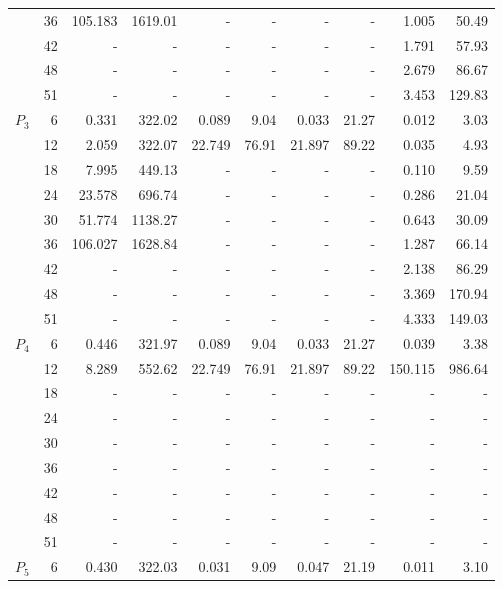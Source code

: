 \begin{figure}[h!]
\begin{tabular}{| r | r | r | r | r | r | r | r | r | r |}
		{} & 36 & 105.183 & 1619.01 & - & - & - & - & 1.005 & 50.49  \\
		{} & 42 & - & - & - & - & - & - & 1.791 & 57.93  \\
		{} & 48 & - & - & - & - & - & - & 2.679 & 86.67  \\
		{} & 51 & - & - & - & - & - & - & 3.453 & 129.83  \\
		\hline
		\multirow{6}{*}{$P_3$} & 6 & 0.331 & 322.02 & 0.089 & 9.04 & 0.033 & 21.27 & 0.012 & 3.03  \\
		{} & 12 & 2.059 & 322.07 & 22.749 & 76.91 & 21.897 & 89.22 & 0.035 & 4.93  \\
		{} & 18 & 7.995 & 449.13 & - & - & - & - & 0.110 & 9.59  \\
		{} & 24 & 23.578 & 696.74 & - & - & - & - & 0.286 & 21.04  \\
		{} & 30 & 51.774 & 1138.27 & - & - & - & - & 0.643 & 30.09  \\
		{} & 36 & 106.027 & 1628.84 & - & - & - & - & 1.287 & 66.14  \\
		{} & 42 & - & - & - & - & - & - & 2.138 & 86.29  \\
		{} & 48 & - & - & - & - & - & - & 3.369 & 170.94  \\
		{} & 51 & - & - & - & - & - & - & 4.333 & 149.03  \\
		\hline
		\multirow{6}{*}{$P_4$} & 6 & 0.446 & 321.97 & 0.089 & 9.04 & 0.033 & 21.27 & 0.039 & 3.38  \\
		{} & 12 & 8.289 & 552.62 & 22.749 & 76.91 & 21.897 & 89.22 & 150.115 & 986.64  \\
		{} & 18 & - & - & - & - & - & - & - & -  \\
		{} & 24 & - & - & - & - & - & - & - & -  \\
		{} & 30 & - & - & - & - & - & - & - & -  \\
		{} & 36 & - & - & - & - & - & - & - & -  \\
		{} & 42 & - & - & - & - & - & - & - & -  \\
		{} & 48 & - & - & - & - & - & - & - & -  \\
		{} & 51 & - & - & - & - & - & - & - & -  \\
		\hline
		\multirow{6}{*}{$P_5$} & 6 & 0.430 & 322.03 & 0.031 & 9.09 & 0.047 & 21.19 & 0.011 & 3.10  \\

\end{tabular}
\end{figure}
